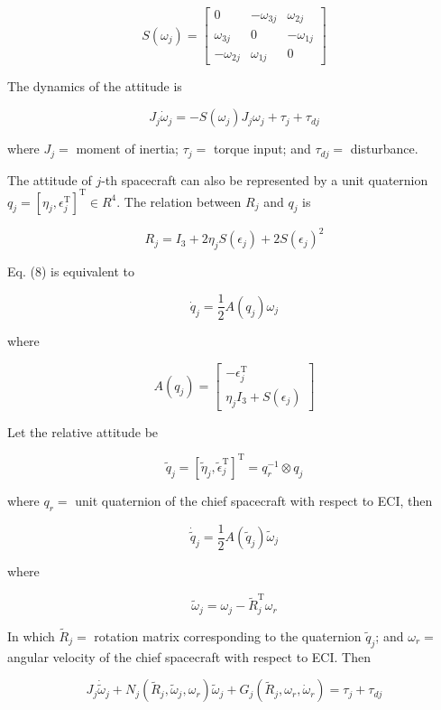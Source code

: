 \documentclass[10pt]{article}
\begin{document}
$$
S\left(\omega_{j}\right)=\left[\begin{array}{ccc}
0 & -\omega_{3 j} & \omega_{2 j} \\
\omega_{3 j} & 0 & -\omega_{1 j} \\
-\omega_{2 j} & \omega_{1 j} & 0
\end{array}\right]
$$

The dynamics of the attitude is

$$
J_{j} \dot{\omega}_{j}=-S\left(\omega_{j}\right) J_{j} \omega_{j}+\tau_{j}+\tau_{d j}
$$

where $J_{j}=$ moment of inertia; $\tau_{j}=$ torque input; and $\tau_{d j}=$ disturbance.

The attitude of $j$-th spacecraft can also be represented by a unit quaternion $q_{j}=\left[\eta_{j}, \epsilon_{j}^{\mathrm{T}}\right]^{\mathrm{T}} \in R^{4}$. The relation between $R_{j}$ and $q_{j}$ is

$$
R_{j}=I_{3}+2 \eta_{j} S\left(\epsilon_{j}\right)+2 S\left(\epsilon_{j}\right)^{2}
$$

Eq. (8) is equivalent to

$$
\dot{q}_{j}=\frac{1}{2} A\left(q_{j}\right) \omega_{j}
$$

where

$$
A\left(q_{j}\right)=\left[\begin{array}{c}
-\epsilon_{j}^{\mathrm{T}} \\
\eta_{j} I_{3}+S\left(\epsilon_{j}\right)
\end{array}\right]
$$

Let the relative attitude be

$$
\tilde{q}_{j}=\left[\tilde{\eta}_{j}, \tilde{\epsilon}_{j}^{\mathrm{T}}\right]^{\mathrm{T}}=q_{r}^{-1} \otimes q_{j}
$$

where $q_{r}=$ unit quaternion of the chief spacecraft with respect to ECI, then

$$
\dot{\tilde{q}}_{j}=\frac{1}{2} A\left(\tilde{q}_{j}\right) \tilde{\omega}_{j}
$$

where

$$
\tilde{\omega}_{j}=\omega_{j}-\tilde{R}_{j}^{\mathrm{T}} \omega_{r}
$$

In which $\tilde{R}_{j}=$ rotation matrix corresponding to the quaternion $\tilde{q}_{j}$; and $\omega_{r}=$ angular velocity of the chief spacecraft with respect to ECI. Then

$$
J_{j} \dot{\tilde{\omega}}_{j}+N_{j}\left(\tilde{R}_{j}, \tilde{\omega}_{j}, \omega_{r}\right) \tilde{\omega}_{j}+G_{j}\left(\tilde{R}_{j}, \omega_{r}, \dot{\omega}_{r}\right)=\tau_{j}+\tau_{d j}
$$
\end{document}
